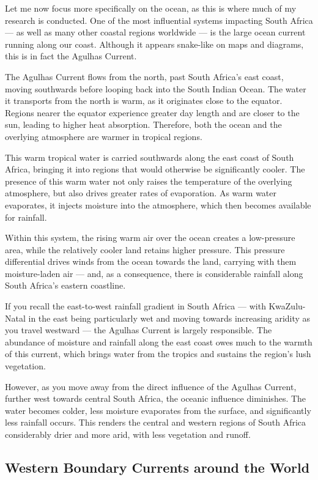 \documentclass[
  12pt,
]{book}
\begin{document}
Let me now focus more specifically on the ocean, as this is where much
of my research is conducted. One of the most influential systems
impacting South Africa --- as well as many other coastal regions
worldwide --- is the large ocean current running along our coast.
Although it appears snake-like on maps and diagrams, this is in fact the
Agulhas Current.

The Agulhas Current flows from the north, past South Africa's east
coast, moving southwards before looping back into the South Indian
Ocean. The water it transports from the north is warm, as it originates
close to the equator. Regions nearer the equator experience greater day
length and are closer to the sun, leading to higher heat absorption.
Therefore, both the ocean and the overlying atmosphere are warmer in
tropical regions.

This warm tropical water is carried southwards along the east coast of
South Africa, bringing it into regions that would otherwise be
significantly cooler. The presence of this warm water not only raises
the temperature of the overlying atmosphere, but also drives greater
rates of evaporation. As warm water evaporates, it injects moisture into
the atmosphere, which then becomes available for rainfall.

Within this system, the rising warm air over the ocean creates a
low-pressure area, while the relatively cooler land retains higher
pressure. This pressure differential drives winds from the ocean towards
the land, carrying with them moisture-laden air --- and, as a
consequence, there is considerable rainfall along South Africa's eastern
coastline.

If you recall the east-to-west rainfall gradient in South Africa ---
with KwaZulu-Natal in the east being particularly wet and moving towards
increasing aridity as you travel westward --- the Agulhas Current is
largely responsible. The abundance of moisture and rainfall along the
east coast owes much to the warmth of this current, which brings water
from the tropics and sustains the region's lush vegetation.

However, as you move away from the direct influence of the Agulhas
Current, further west towards central South Africa, the oceanic
influence diminishes. The water becomes colder, less moisture evaporates
from the surface, and significantly less rainfall occurs. This renders
the central and western regions of South Africa considerably drier and
more arid, with less vegetation and runoff.

\subsection{Western Boundary Currents around the
World}\label{western-boundary-currents-around-the-world}
\end{document}
